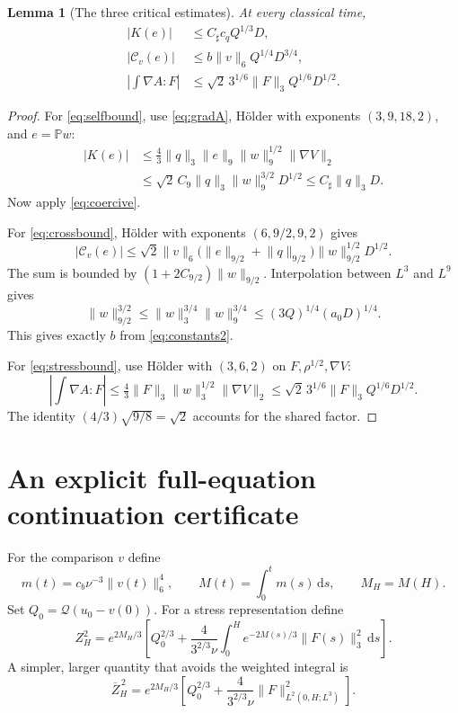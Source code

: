 \documentclass[11pt,a4paper]{article}
\newtheorem{lemma}[theorem]{Lemma}
\theoremstyle{definition}\newtheorem{definition}[theorem]{Definition}
\theoremstyle{remark}\newtheorem{remark}[theorem]{Remark}
\newcommand{\Q}{\mathcal Q}
\newcommand{\PP}{\mathbb P}
\newcommand{\dd}{\,\mathrm d}
\newcommand{\norm}[1]{\lVert #1\rVert}
\newcommand{\Cstar}{C_\sharp}
\newcommand{\cb}{c_b}
\numberwithin{equation}{section}
\begin{document}
\begin{lemma}[The three critical estimates]\label{lem:three}
At every classical time,
\begin{align}
 |K(e)|&\le\Cstar c_q Q^{1/3}D,\label{eq:selfbound}\\
 |\mathcal C_v(e)|&\le b\norm v_6Q^{1/4}D^{3/4},\label{eq:crossbound}\\
 \left|\int\nabla A:F\right|&\le\sqrt2\,3^{1/6}\norm F_3 Q^{1/6}D^{1/2}.\label{eq:stressbound}
\end{align}
\end{lemma}
\begin{proof}
For \eqref{eq:selfbound}, use \eqref{eq:gradA}, H\"older with exponents $(3,9,18,2)$, and $e=\PP w$:
\begin{align*}
 |K(e)|&\le\tfrac43\norm q_3\norm e_9\norm w_9^{1/2}\norm{\nabla V}_2\\
 &\le\sqrt2\,C_9\norm q_3\norm w_9^{3/2}D^{1/2}
 \le\Cstar\norm q_3D.
\end{align*}
Now apply \eqref{eq:coercive}.

For \eqref{eq:crossbound}, H\"older with exponents $(6,9/2,9,2)$ gives
\[
 |\mathcal C_v(e)|\le\sqrt2\norm v_6
 \bigl(\norm e_{9/2}+\norm q_{9/2}\bigr)\norm w_{9/2}^{1/2}D^{1/2}.
\]
The sum is bounded by $(1+2C_{9/2})\norm w_{9/2}$. Interpolation between $L^3$ and $L^9$ gives
\[
 \norm w_{9/2}^{3/2}\le\norm w_3^{3/4}\norm w_9^{3/4}
 \le(3Q)^{1/4}(a_0D)^{1/4}.
\]
This gives exactly $b$ from \eqref{eq:constants2}.

For \eqref{eq:stressbound}, use H\"older with $(3,6,2)$ on $F,\rho^{1/2},\nabla V$:
\[
 \left|\int\nabla A:F\right|
 \le\tfrac43\norm F_3\norm w_3^{1/2}\norm{\nabla V}_2
 \le\sqrt2\,3^{1/6}\norm F_3Q^{1/6}D^{1/2}.
\]
The identity $(4/3)\sqrt{9/8}=\sqrt2$ accounts for the shared factor.
\end{proof}

\section{An explicit full-equation continuation certificate}
\label{sec:certificate}
For the comparison $v$ define
\begin{equation}\label{eq:m}
 m(t)=\cb\nu^{-3}\norm{v(t)}_6^4,\qquad
 M(t)=\int_0^t m(s)\dd s,\qquad M_H=M(H).
\end{equation}
Set $Q_0=\Q(u_0-v(0))$. For a stress representation define
\begin{equation}\label{eq:Zsharp}
 Z_H^2=e^{2M_H/3}\left[
 Q_0^{2/3}+\frac4{3^{2/3}\nu}
 \int_0^H e^{-2M(s)/3}\norm{F(s)}_3^2\dd s\right].
\end{equation}
A simpler, larger quantity that avoids the weighted integral is
\begin{equation}\label{eq:Zsimple}
 \overline Z_H^{\,2}=e^{2M_H/3}\left[
 Q_0^{2/3}+\frac4{3^{2/3}\nu}\norm F_{L^2(0,H;L^3)}^2\right].
\end{equation}
\end{document}
